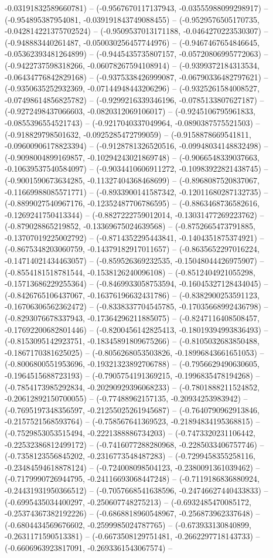 -0.03191832589660781) -- (-0.9567670117137943, -0.03555988099298917) -- (-0.954895387954081, -0.039191843749088455) -- (-0.9529576505170735, -0.042814221375702524) -- (-0.9509537013171188, -0.0464270223530307) -- (-0.948883440261487, -0.050030256457744976) -- (-0.9467467654846645, -0.05362393481264899) -- (-0.9445435735807157, -0.05720806995772063) -- (-0.9422737598318266, -0.06078267594108914) -- (-0.9399372184313534, -0.06434776842829168) -- (-0.9375338426999087, -0.06790336482797621) -- (-0.9350635252932369, -0.07144948443206296) -- (-0.9325261584008527, -0.07498614856825782) -- (-0.9299216339346196, -0.0785133807627187) -- (-0.9272498437066603, -0.0820312069106017) -- (-0.9245106795961833, -0.0855396554521743) -- (-0.9217040337049964, -0.0890387575521503) -- (-0.918829798501632, -0.0925285472799059) -- (-0.9158878669541811, -0.09600906178823394) -- (-0.9128781326520516, -0.09948034148832498) -- (-0.9098004899169857, -0.10294243021869748) -- (-0.9066548339037663, -0.10639537540584097) -- (-0.9034410606911272, -0.10983922821438745) -- (-0.9001590673634285, -0.11327404368468699) -- (-0.8968087520837067, -0.11669988085571771) -- (-0.8933900141587342, -0.12011680287132735) -- (-0.8899027540967176, -0.12352487706786595) -- (-0.8863468736582616, -0.1269241750413344) -- (-0.8827222759012014, -0.13031477269223762) -- (-0.879028865219852, -0.13369675024639568) -- (-0.8752665473791885, -0.13707019225002792) -- (-0.8714352295443841, -0.1404351875374921) -- (-0.8675348203060759, -0.14379182917011657) -- (-0.8635652297016224, -0.14714021434463057) -- (-0.859526369232535, -0.15048044426975907) -- (-0.8554181518781544, -0.1538126240096108) -- (-0.8512404921055298, -0.15713686229255364) -- (-0.8469933058753594, -0.16045327128434045) -- (-0.8426765106437067, -0.16376196632431786) -- (-0.8382900253591123, -0.16706306562362472) -- (-0.8338337704545785, -0.17035668992436798) -- (-0.8293076678337943, -0.17364296211885075) -- (-0.8247116408508457, -0.17692200682801446) -- (-0.8200456142825413, -0.18019394993836493) -- (-0.8153095142923751, -0.18345891809675266) -- (-0.8105032683850488, -0.1867170381625025) -- (-0.8056268053503826, -0.18996843661651053) -- (-0.8006800551953696, -0.19321323892706788) -- (-0.7956629490630605, -0.1964515688723193) -- (-0.7905754191369215, -0.1996835478194268) -- (-0.7854173985292834, -0.20290929396068233) -- (-0.7801888211524852, -0.20612892150700055) -- (-0.77488962157135, -0.20934253983942) -- (-0.7695197348356597, -0.21255025261945687) -- (-0.7640790962913846, -0.2157521568593764) -- (-0.758567641369523, -0.21894834195368815) -- (-0.7529853053515494, -0.2221388886734203) -- (-0.7473320231106442, -0.22532386812499172) -- (-0.7416077288280968, -0.2285033406757746) -- (-0.7358123556845202, -0.2316773548487283) -- (-0.7299458355258116, -0.23484594618878124) -- (-0.724008098504123, -0.2380091361039462) -- (-0.7179990726944795, -0.24116693068447248) -- (-0.7119186836880924, -0.24431931950366512) -- (-0.7057668541638596, -0.24746627440433833) -- (-0.6995435034400297, -0.250607748275213) -- (-0.6932485470085172, -0.25374367382192226) -- (-0.6868818960548967, -0.256873962337648) -- (-0.6804434569676602, -0.2599985024787765) -- (-0.673933130840899, -0.2631171590513381) -- (-0.6673508129751481, -0.2662297718143733) -- (-0.6606963923817091, -0.2693361543067574) -- 